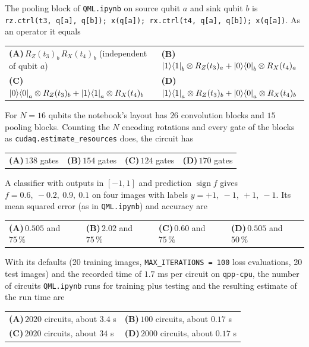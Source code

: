 \documentclass[11pt,a4paper]{article}
\newcommand{\optlabel}[1]{\textbf{(#1)}}
\newenvironment{qitem}[1]{\begin{list}{}{\setlength{\leftmargin}{3.3em}\setlength{\labelwidth}{3.1em}%
  \setlength{\labelsep}{0.2em}\setlength{\topsep}{3pt}\setlength{\parsep}{3pt}}\item[\textbf{Q.#1}\hfill]}{\end{list}}
\newcommand{\qsep}{\par\vspace{2pt}{\color{black!15}\hrule}\vspace{4pt}}
\begin{document}
\begin{qitem}{50}
The pooling block of \texttt{QML.ipynb} on source qubit $a$ and sink qubit $b$ is
\texttt{rz.ctrl(t3, q[a], q[b]); x(q[a]); rx.ctrl(t4, q[a], q[b]); x(q[a])}. As an operator it equals
\par\smallskip\noindent\begin{tabularx}{\linewidth}{@{}*{2}{L}@{}}
\optlabel{A}\,$R_Z(t_3)_b\,R_X(t_4)_b$ (independent of qubit $a$) & \optlabel{B}\,$\ket1\!\bra1_b\otimes R_Z(t_3)_a + \ket0\!\bra0_b\otimes R_X(t_4)_a$ \\[3pt]
\optlabel{C}\,$\ket0\!\bra0_a\otimes R_Z(t_3)_b + \ket1\!\bra1_a\otimes R_X(t_4)_b$ & \optlabel{D}\,$\ket1\!\bra1_a\otimes R_Z(t_3)_b + \ket0\!\bra0_a\otimes R_X(t_4)_b$
\end{tabularx}
\end{qitem}
\qsep

\begin{qitem}{51}
For $N = 16$ qubits the notebook's layout has $26$ convolution blocks and $15$ pooling blocks. Counting the $N$
encoding rotations and every gate of the blocks as \texttt{cudaq.estimate\_resources} does, the circuit has
\par\smallskip\noindent\begin{tabularx}{\linewidth}{@{}*{4}{L}@{}}
\optlabel{A}\,$138$ gates & \optlabel{B}\,$154$ gates & \optlabel{C}\,$124$ gates & \optlabel{D}\,$170$ gates
\end{tabularx}
\end{qitem}
\qsep

\begin{qitem}{52}
A classifier with outputs in $[-1, 1]$ and prediction $\operatorname{sign} f$ gives $f = 0.6,\ -0.2,\ 0.9,\ 0.1$ on four
images with labels $y = +1,\ -1,\ +1,\ -1$. Its mean squared error (as in \texttt{QML.ipynb}) and accuracy are
\par\smallskip\noindent\begin{tabularx}{\linewidth}{@{}*{4}{L}@{}}
\optlabel{A}\,$0.505$ and $75\,\%$ & \optlabel{B}\,$2.02$ and $75\,\%$ & \optlabel{C}\,$0.60$ and $75\,\%$ & \optlabel{D}\,$0.505$ and $50\,\%$
\end{tabularx}
\end{qitem}
\qsep

\begin{qitem}{53}
With its defaults (20 training images, \texttt{MAX\_ITERATIONS = 100} loss evaluations, 20 test images) and the
recorded time of $1.7$ ms per circuit on \texttt{qpp-cpu}, the number of circuits \texttt{QML.ipynb} runs for training plus testing
and the resulting estimate of the run time are
\par\smallskip\noindent\begin{tabularx}{\linewidth}{@{}*{2}{L}@{}}
\optlabel{A}\,$2020$ circuits, about $3.4$ s & \optlabel{B}\,$100$ circuits, about $0.17$ s \\[3pt]
\optlabel{C}\,$2020$ circuits, about $34$ s & \optlabel{D}\,$2000$ circuits, about $0.17$ s
\end{tabularx}
\end{qitem}
\qsep
\end{document}
